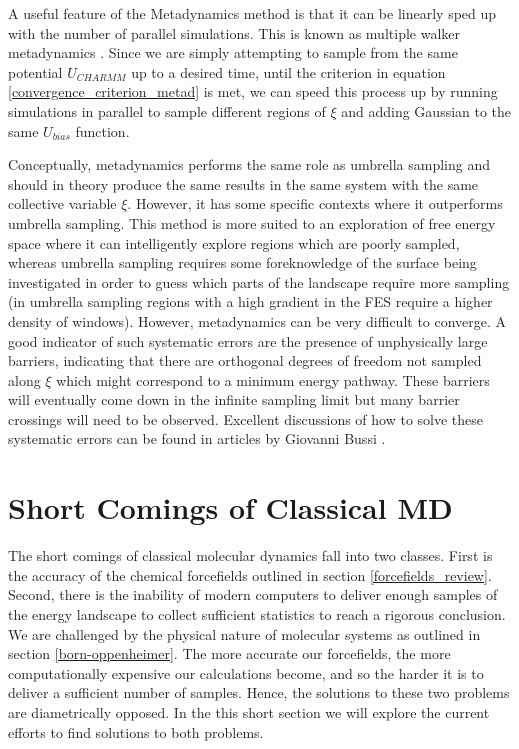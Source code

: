 A useful feature of the Metadynamics method is that it can be linearly sped up with the number of parallel simulations. This is known as multiple walker metadynamics \cite{raiteri2006}. Since we are simply attempting to sample from the same potential $U_{CHARMM}$ up to a desired time, until the criterion in equation \ref{convergence_criterion_metad} is met, we can speed this process up by running simulations in parallel to sample different regions of $\xi$ and adding Gaussian to the same $U_{bias}$ function.

Conceptually, metadynamics performs the same role as umbrella sampling and should in theory produce the same results in the same system with the same collective variable $\xi$. However, it has some specific contexts where it outperforms umbrella sampling. This method is more suited to an exploration of free energy space where it can intelligently explore regions which are poorly sampled, whereas umbrella sampling requires some foreknowledge of the surface being investigated in order to guess which parts of the landscape require more sampling (in umbrella sampling regions with a high gradient in the FES require a higher density of windows). However, metadynamics can be very difficult to converge. A good indicator of such systematic errors are the presence of unphysically large barriers, indicating that there are orthogonal degrees of freedom not sampled along $\xi$ which might correspond to a minimum energy pathway. These barriers will eventually come down in the infinite sampling limit but many barrier crossings will need to be observed. Excellent discussions of how to solve these systematic errors can be found in articles by Giovanni Bussi \cite{bussi2015, bussi2020a}.

\section{Short Comings of Classical MD}
The short comings of classical molecular dynamics fall into two classes. First is the accuracy of the chemical forcefields outlined in section \ref{forcefields_review}. Second, there is the inability of modern computers to deliver enough samples of the energy landscape to collect sufficient statistics to reach a rigorous conclusion. We are challenged by the physical nature of molecular systems as outlined in section \ref{born-oppenheimer}. The more accurate our forcefields, the more computationally expensive our calculations become, and so the harder it is to deliver a sufficient number of samples. Hence, the solutions to these two problems are diametrically opposed. In the this short section we will explore the current efforts to find solutions to both problems.

